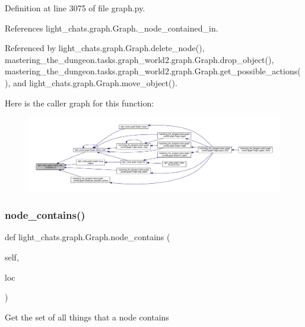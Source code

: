 Definition at line 3075 of file graph.\+py.



References light\+\_\+chats.\+graph.\+Graph.\+\_\+node\+\_\+contained\+\_\+in.



Referenced by light\+\_\+chats.\+graph.\+Graph.\+delete\+\_\+node(), mastering\+\_\+the\+\_\+dungeon.\+tasks.\+graph\+\_\+world2.\+graph.\+Graph.\+drop\+\_\+object(), mastering\+\_\+the\+\_\+dungeon.\+tasks.\+graph\+\_\+world2.\+graph.\+Graph.\+get\+\_\+possible\+\_\+actions(), and light\+\_\+chats.\+graph.\+Graph.\+move\+\_\+object().

Here is the caller graph for this function\+:
\nopagebreak
\begin{figure}[H]
\begin{center}
\leavevmode
\includegraphics[width=350pt]{classlight__chats_1_1graph_1_1Graph_a6afbdb89ba9db7f792506d9171f9e287_icgraph}
\end{center}
\end{figure}
\mbox{\label{classlight__chats_1_1graph_1_1Graph_aaf9882eb0e887eadf75e4f2460732c05}} 
\subsubsection{\texorpdfstring{node\+\_\+contains()}{node\_contains()}}
{\footnotesize\ttfamily def light\+\_\+chats.\+graph.\+Graph.\+node\+\_\+contains (\begin{DoxyParamCaption}\item[{}]{self,  }\item[{}]{loc }\end{DoxyParamCaption})}

\begin{DoxyVerb}Get the set of all things that a node contains\end{DoxyVerb}
 

